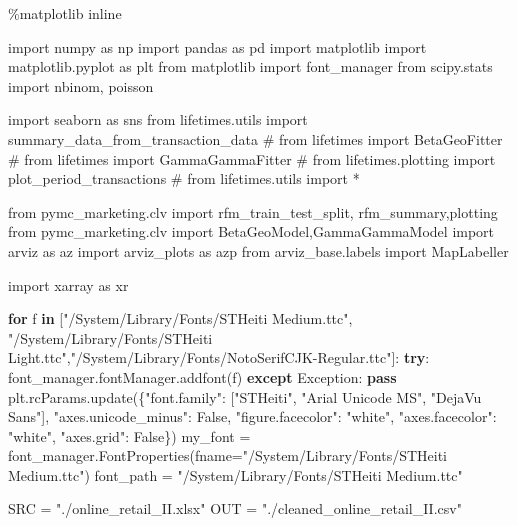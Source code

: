 \documentclass[
]{ctexart}
\newenvironment{Shaded}{\begin{snugshade}}{\end{snugshade}}
\newcommand{\CommentTok}[1]{\textcolor[rgb]{0.37,0.37,0.37}{#1}}
\newcommand{\ControlFlowTok}[1]{\textcolor[rgb]{0.00,0.23,0.31}{\textbf{#1}}}
\newcommand{\ImportTok}[1]{\textcolor[rgb]{0.00,0.46,0.62}{#1}}
\newcommand{\KeywordTok}[1]{\textcolor[rgb]{0.00,0.23,0.31}{\textbf{#1}}}
\newcommand{\NormalTok}[1]{\textcolor[rgb]{0.00,0.23,0.31}{#1}}
\newcommand{\OperatorTok}[1]{\textcolor[rgb]{0.37,0.37,0.37}{#1}}
\newcommand{\PreprocessorTok}[1]{\textcolor[rgb]{0.68,0.00,0.00}{#1}}
\newcommand{\StringTok}[1]{\textcolor[rgb]{0.13,0.47,0.30}{#1}}
\newcommand{\VariableTok}[1]{\textcolor[rgb]{0.07,0.07,0.07}{#1}}
\begin{document}
\begin{Shaded}
\begin{Highlighting}[]
\OperatorTok{\%}\NormalTok{matplotlib inline}

\ImportTok{import}\NormalTok{ numpy }\ImportTok{as}\NormalTok{ np}
\ImportTok{import}\NormalTok{ pandas }\ImportTok{as}\NormalTok{ pd}
\ImportTok{import}\NormalTok{ matplotlib}
\ImportTok{import}\NormalTok{ matplotlib.pyplot }\ImportTok{as}\NormalTok{ plt}
\ImportTok{from}\NormalTok{ matplotlib }\ImportTok{import}\NormalTok{ font\_manager}
\ImportTok{from}\NormalTok{ scipy.stats }\ImportTok{import}\NormalTok{ nbinom, poisson}

\ImportTok{import}\NormalTok{ seaborn }\ImportTok{as}\NormalTok{ sns}
\ImportTok{from}\NormalTok{ lifetimes.utils }\ImportTok{import}\NormalTok{ summary\_data\_from\_transaction\_data}
\CommentTok{\# from lifetimes import BetaGeoFitter}
\CommentTok{\# from lifetimes import GammaGammaFitter}
\CommentTok{\# from lifetimes.plotting import plot\_period\_transactions}
\CommentTok{\# from lifetimes.utils import *}

\ImportTok{from}\NormalTok{ pymc\_marketing.clv }\ImportTok{import}\NormalTok{ rfm\_train\_test\_split, rfm\_summary,plotting}
\ImportTok{from}\NormalTok{ pymc\_marketing.clv }\ImportTok{import}\NormalTok{ BetaGeoModel,GammaGammaModel}
\ImportTok{import}\NormalTok{ arviz }\ImportTok{as}\NormalTok{ az}
\ImportTok{import}\NormalTok{ arviz\_plots }\ImportTok{as}\NormalTok{ azp}
\ImportTok{from}\NormalTok{ arviz\_base.labels }\ImportTok{import}\NormalTok{ MapLabeller}

\ImportTok{import}\NormalTok{ xarray }\ImportTok{as}\NormalTok{ xr}

\ControlFlowTok{for}\NormalTok{ f }\KeywordTok{in}\NormalTok{ [}\StringTok{"/System/Library/Fonts/STHeiti Medium.ttc"}\NormalTok{, }\StringTok{"/System/Library/Fonts/STHeiti Light.ttc"}\NormalTok{,}\StringTok{"/System/Library/Fonts/NotoSerifCJK{-}Regular.ttc"}\NormalTok{]:}
    \ControlFlowTok{try}\NormalTok{:}
\NormalTok{        font\_manager.fontManager.addfont(f)}
    \ControlFlowTok{except} \PreprocessorTok{Exception}\NormalTok{:}
        \ControlFlowTok{pass}
\NormalTok{plt.rcParams.update(\{}\StringTok{"font.family"}\NormalTok{: [}\StringTok{"STHeiti"}\NormalTok{, }\StringTok{"Arial Unicode MS"}\NormalTok{, }\StringTok{"DejaVu Sans"}\NormalTok{],}
                     \StringTok{"axes.unicode\_minus"}\NormalTok{: }\VariableTok{False}\NormalTok{, }\StringTok{"figure.facecolor"}\NormalTok{: }\StringTok{"white"}\NormalTok{,}
                     \StringTok{"axes.facecolor"}\NormalTok{: }\StringTok{"white"}\NormalTok{, }\StringTok{"axes.grid"}\NormalTok{: }\VariableTok{False}\NormalTok{\})}
\NormalTok{my\_font }\OperatorTok{=}\NormalTok{ font\_manager.FontProperties(fname}\OperatorTok{=}\StringTok{"/System/Library/Fonts/STHeiti Medium.ttc"}\NormalTok{)}
\NormalTok{font\_path }\OperatorTok{=} \StringTok{"/System/Library/Fonts/STHeiti Medium.ttc"}


\NormalTok{SRC }\OperatorTok{=} \StringTok{"./online\_retail\_II.xlsx"}
\NormalTok{OUT }\OperatorTok{=} \StringTok{"./cleaned\_online\_retail\_II.csv"}
\end{Highlighting}
\end{Shaded}
\end{document}
